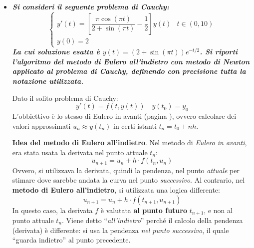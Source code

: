 \begin{itemize}
    \newpage


    \item \textcolor{Red2}{\textbf{\emph{Si consideri il seguente problema di Cauchy:
    \begin{equation*}
        \begin{cases}
            y'(t) = \left[\dfrac{\pi \cos\left(\pi t\right)}{2 + \sin\left(\pi t\right)} - \dfrac{1}{2}\right] y(t) & t \in \left(0, 10\right) \\[1em]
            y(0) = 2
        \end{cases}
    \end{equation*}
    La cui soluzione esatta è $y(t) = \left(2 + \sin\left(\pi t\right)\right) e^{- t/2}$. Si riporti l'algoritmo del metodo di Eulero all'indietro con metodo di Newton applicato al problema di Cauchy, definendo con precisione tutta la notazione utilizzata.}}}

     Dato il solito problema di Cauchy:
    \begin{equation*}
        y'(t) = f(t, y(t)) \quad y(t_0) = y_0
    \end{equation*}
    L'obbiettivo è lo stesso di Eulero in avanti (pagina ), ovvero calcolare dei valori approssimati $u_{n} \approx y\left(t_{n}\right)$ in certi istanti $t_{n} = t_{0} + n h$.

    \highspace
    \textbf{Idea del metodo di Eulero all'indietro}. Nel metodo di \emph{Eulero in avanti}, era stata usata la derivata nel punto attuale $t_{n}$:
    \begin{equation*}
        u_{n+1} = u_{n} + h \cdot f(t_{n}, u_{n})
    \end{equation*}
    Ovvero, si utilizzava la derivata, quindi la pendenza, nel punto \emph{attuale} per stimare dove sarebbe andata la curva nel punto \emph{successivo}. Al contrario, nel \textbf{metodo di Eulero all'indietro}, si utilizzata una logica differente:
    \begin{equation*}
        u_{n+1} = u_{n} + h \cdot f(t_{n+1}, u_{n+1})
    \end{equation*}
    In questo caso, la derivata $f$ è valutata \textbf{al punto futuro} $t_{n+1}$, e non al punto attuale $t_{n}$. Viene detto ``\emph{all'indietro}'' perché il calcolo della pendenza (derivata) è differente: si usa la pendenza \emph{nel punto successivo}, il quale ``guarda indietro'' al punto precedente.


\end{itemize}
